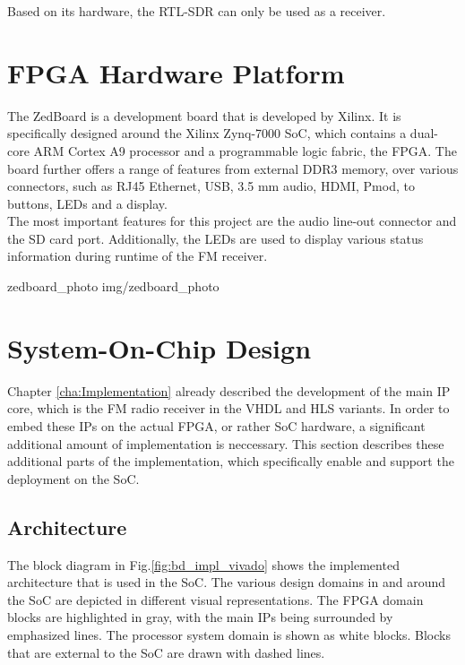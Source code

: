 \noindent
Based on its hardware, the RTL-SDR can only be used as a receiver.


\section{FPGA Hardware Platform}

The ZedBoard is a development board that is developed by Xilinx.
It is specifically designed around the Xilinx Zynq-7000 SoC, which contains a dual-core ARM Cortex A9 processor and a programmable logic fabric, the FPGA.
The board further offers a range of features from external DDR3 memory, over various connectors, such as RJ45 Ethernet, USB, 3.5 mm audio, HDMI, Pmod, to buttons, LEDs and a display.\\

The most important features for this project are the audio line-out connector and the SD card port.
Additionally, the LEDs are used to display various status information during runtime of the FM receiver.

 {zedboard_photo} {img/zedboard_photo}

\section{System-On-Chip Design}

Chapter \ref{cha:Implementation} already described the development of the main IP core, which is the FM radio receiver in the VHDL and HLS variants.
In order to embed these IPs on the actual FPGA, or rather SoC hardware, a significant additional amount of implementation is neccessary.
This section describes these additional parts of the implementation, which specifically enable and support the deployment on the SoC.

\subsection{Architecture}

The block diagram in Fig.\ref{fig:bd_impl_vivado} shows the implemented architecture that is used in the SoC.
The various design domains in and around the SoC are depicted in different visual representations.
The FPGA domain blocks are highlighted in gray, with the main IPs being surrounded by emphasized lines.
The processor system domain is shown as white blocks.
Blocks that are external to the SoC are drawn with dashed lines.

